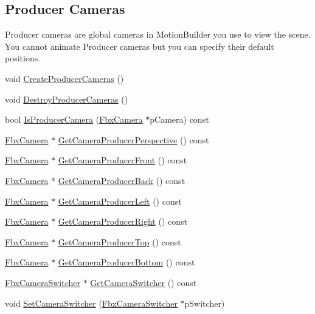 \subsection*{Producer Cameras}
\label{_amgrpdf8c7ffb8bdef1e4f35722221c5ded0f}%
Producer cameras are global cameras in Motion\+Builder you use to view the scene. You cannot animate Producer cameras but you can specify their default positions. \begin{DoxyCompactItemize}
\item 
void \hyperlink{class_fbx_global_camera_settings_a2b2e508928ea3b21b25574635089f025}{Create\+Producer\+Cameras} ()
\item 
void \hyperlink{class_fbx_global_camera_settings_a083cbc9ad5466346559025508aed6dc6}{Destroy\+Producer\+Cameras} ()
\item 
bool \hyperlink{class_fbx_global_camera_settings_abcabe0a434ecb96f58711e16f6f7abc5}{Is\+Producer\+Camera} (\hyperlink{class_fbx_camera}{Fbx\+Camera} $\ast$p\+Camera) const
\item 
\hyperlink{class_fbx_camera}{Fbx\+Camera} $\ast$ \hyperlink{class_fbx_global_camera_settings_a4353a05481d6dad14fbd6f3fdaf8541c}{Get\+Camera\+Producer\+Perspective} () const
\item 
\hyperlink{class_fbx_camera}{Fbx\+Camera} $\ast$ \hyperlink{class_fbx_global_camera_settings_afb4ff79f5f970e8b86e68b56a40f3116}{Get\+Camera\+Producer\+Front} () const
\item 
\hyperlink{class_fbx_camera}{Fbx\+Camera} $\ast$ \hyperlink{class_fbx_global_camera_settings_ad11a62b3c4249a802f4a4e9c98d8b966}{Get\+Camera\+Producer\+Back} () const
\item 
\hyperlink{class_fbx_camera}{Fbx\+Camera} $\ast$ \hyperlink{class_fbx_global_camera_settings_a5541de057d1ce39e712c42f5913d8ee7}{Get\+Camera\+Producer\+Left} () const
\item 
\hyperlink{class_fbx_camera}{Fbx\+Camera} $\ast$ \hyperlink{class_fbx_global_camera_settings_a0166b7f6aac53c8a9b3f6deabf77a09e}{Get\+Camera\+Producer\+Right} () const
\item 
\hyperlink{class_fbx_camera}{Fbx\+Camera} $\ast$ \hyperlink{class_fbx_global_camera_settings_a24d688c9385c1393c552bd05e124f104}{Get\+Camera\+Producer\+Top} () const
\item 
\hyperlink{class_fbx_camera}{Fbx\+Camera} $\ast$ \hyperlink{class_fbx_global_camera_settings_a6a24f852c638f6a599f5b63078454112}{Get\+Camera\+Producer\+Bottom} () const
\item 
\hyperlink{class_fbx_camera_switcher}{Fbx\+Camera\+Switcher} $\ast$ \hyperlink{class_fbx_global_camera_settings_ab581e270145dfa36b239171811cc35b9}{Get\+Camera\+Switcher} () const
\item 
void \hyperlink{class_fbx_global_camera_settings_ac5828573eccccf2e76529ad21f77ff3c}{Set\+Camera\+Switcher} (\hyperlink{class_fbx_camera_switcher}{Fbx\+Camera\+Switcher} $\ast$p\+Switcher)
\end{DoxyCompactItemize}



